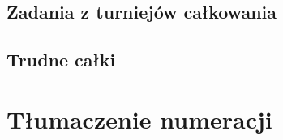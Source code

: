 \documentclass[9pt, twoside, a5paper]{extbook}
\theoremstyle{remark}
\begin{document}
\section{Zadania z turniejów całkowania}
	



\section{Trudne całki}
	
	
	


\chapter{Tłumaczenie numeracji}


\printindex

\printindex[persons]

\raggedright
{}

\end{document}
